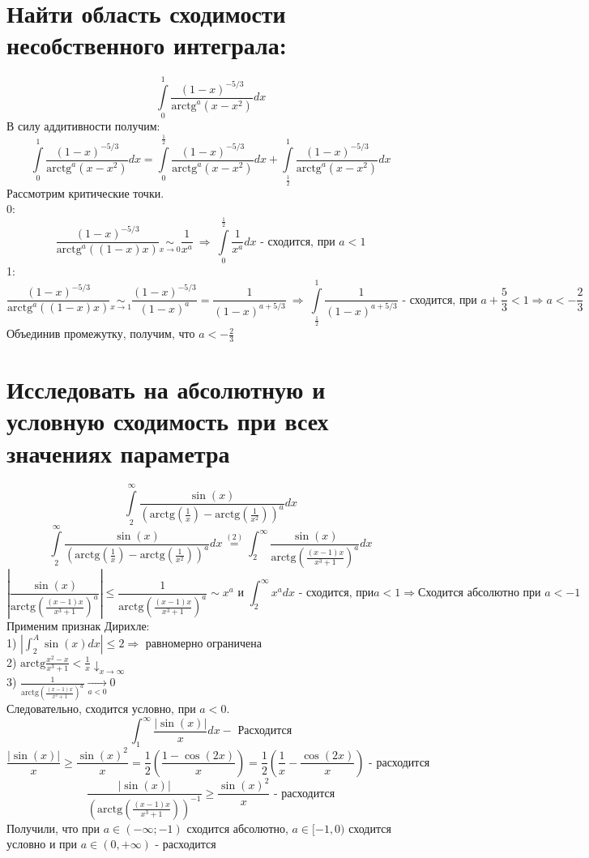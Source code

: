 \documentclass{article}
\begin{document}
	\section{Найти область сходимости несобственного интеграла:}
	\[\int\limits_0^1 \frac{(1-x)^{-5/3}}{\text{arctg}^a(x-x^2)}dx\]
	В силу аддитивности получим:
	\\
	\[\int\limits_0^1 \frac{(1-x)^{-5/3}}{\text{arctg}^a(x-x^2)}dx = \int\limits_0^\frac{1}{2} \frac{(1-x)^{-5/3}}{\text{arctg}^a(x-x^2)}dx + \int\limits_\frac{1}{2}^1 \frac{(1-x)^{-5/3}}{\text{arctg}^a(x-x^2)}dx\]
	Рассмотрим критические точки.\\
	0:
	\[\frac{(1-x)^{-5/3}}{\text{arctg}^a((1-x)x)}\underset{x\rightarrow0}{\sim} \frac{1}{x^a} \ \Rightarrow \ \int\limits_{0}^{\frac{1}{2}}\frac{1}{x^a}dx \text{ - сходится, при } a < 1\]
	1:
	\[\frac{(1-x)^{-5/3}}{\text{arctg}^a((1-x)x)}\underset{x\rightarrow1}{\sim}\frac{(1-x)^{-5/3}}{(1-x)^a} = \frac{1}{(1-x)^{a+5/3}} \ \Rightarrow \ \int\limits_\frac{1}{2}^1\frac{1}{(1-x)^{a+5/3}}\text{ - сходится, при }a+\frac{5}{3} < 1 \Rightarrow a < -\frac{2}{3}\]
	Объединив промежутку, получим, что $a < -\frac{2}{3}$
	
	\section{Исследовать на абсолютную и условную сходимость при всех значениях параметра}
	\[\int\limits_{2}^{\infty}\frac{\sin(x)}{(\text{arctg}(\frac{1}{x}) - \text{arctg}\left(\frac{1}{x^2}\right))^a}dx\]
	\[\int\limits_{2}^{\infty}\frac{\sin(x)}{(\text{arctg}(\frac{1}{x}) - \text{arctg}\left(\frac{1}{x^2}\right))^a}dx \overset{(2)}{=} \int_2^\infty \frac{\sin(x)}{\text{arctg}\left(\frac{(x-1)x}{x^3+1}\right)^a}dx\]
	\[\left|\frac{\sin(x)}{\text{arctg}\left(\frac{(x-1)x}{x^3+1}\right)^a}\right| \le \frac{1}{\text{arctg}\left(\frac{(x-1)x}{x^3+1}\right)^a} \sim x^a \text{  и  } \int_{2}^{\infty} x^adx \text{ - сходится, при} a < 1 \Rightarrow \text{Сходится абсолютно при }a < -1\]
	Применим признак Дирихле:\\
	1) $\left|\int_{2}^{A}\sin(x)dx\right| \le 2 \Rightarrow$ равномерно ограничена\\
	2) $\text{arctg}\frac{x^2-x}{x^3+1} < \frac{1}{x}\downarrow_{x\rightarrow\infty}$\\
	3) $\frac{1}{\text{arctg}\left(\frac{(x-1)x}{x^3+1}\right)^a} \underset{a < 0}{\rightarrow} 0$\\
	Следовательно, сходится условно, при $a < 0$.
	\[\int_{1}^{\infty}\frac{|\sin(x)|}{x}dx - \text{ Расходится}\]
	\[\frac{|\sin(x)|}{x} \ge \frac{\sin(x)^2}{x} = \frac{1}{2}\left(\frac{1-\cos(2x)}{x}\right) = \frac{1}{2}\left(\frac{1}{x} - \frac{\cos(2x)}{x}\right) \text{ - расходится}\]
	\[\frac{|\sin(x)|}{\left(\text{arctg}\left(\frac{(x-1)x}{x^3+1}\right)\right)^{-1}} \ge \frac{\sin(x)^2}{x} \text{ - расходится}\]
	Получили, что при $a \in (-\infty;-1)$ сходится абсолютно, $a\in[-1, 0)$ сходится условно и при $a\in(0, +\infty)$ - расходится
	
\end{document}
